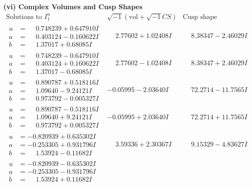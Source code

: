 \documentclass[1p]{elsarticle_modified}
\theoremstyle{definition}
\newcommand{\I}{\sqrt{-1}}
\begin{document}
\newpage\flushleft \textbf{(vi) Complex Volumes and Cusp Shapes}
$$\begin{array}{c|c|c}  
\text{Solutions to }I^u_{1}& \I (\text{vol} + \sqrt{-1}CS) & \text{Cusp shape}\\
 \hline 
\begin{aligned}
u &= \phantom{-}0.748239 + 0.647910 I \\
a &= \phantom{-}0.403124 - 0.160622 I \\
b &= \phantom{-}1.37017 + 0.68085 I\end{aligned}
 & \phantom{-}2.77602 + 1.02408 I & \phantom{-}8.38347 - 2.46029 I \\ \hline\begin{aligned}
u &= \phantom{-}0.748239 - 0.647910 I \\
a &= \phantom{-}0.403124 + 0.160622 I \\
b &= \phantom{-}1.37017 - 0.68085 I\end{aligned}
 & \phantom{-}2.77602 - 1.02408 I & \phantom{-}8.38347 + 2.46029 I \\ \hline\begin{aligned}
u &= \phantom{-}0.890787 + 0.518116 I \\
a &= \phantom{-}1.09640 - 9.24121 I \\
b &= \phantom{-}0.973792 - 0.005327 I\end{aligned}
 & -0.05995 - 2.03640 I & \phantom{-}72.2714 - 11.7565 I \\ \hline\begin{aligned}
u &= \phantom{-}0.890787 - 0.518116 I \\
a &= \phantom{-}1.09640 + 9.24121 I \\
b &= \phantom{-}0.973792 + 0.005327 I\end{aligned}
 & -0.05995 + 2.03640 I & \phantom{-}72.2714 + 11.7565 I \\ \hline\begin{aligned}
u &= -0.820939 + 0.635302 I \\
a &= -0.253305 + 0.931796 I \\
b &= \phantom{-}1.53924 - 0.11682 I\end{aligned}
 & \phantom{-}3.59336 + 2.30367 I & \phantom{-}9.15329 - 4.83627 I \\ \hline\begin{aligned}
u &= -0.820939 - 0.635302 I \\
a &= -0.253305 - 0.931796 I \\
b &= \phantom{-}1.53924 + 0.11682 I\end{aligned}

\end{array}$$
\end{document}
